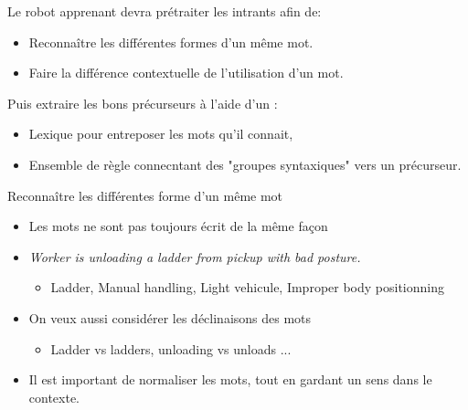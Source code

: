 \begin{frame}	
	Le robot apprenant devra prétraiter les intrants afin de:
	\begin{itemize}
		\item Reconnaître les différentes formes d'un même mot.		
		\item Faire la différence contextuelle de l'utilisation d'un mot.		
	\end{itemize}
	Puis extraire les bons précurseurs à l'aide d'un :
	\begin{itemize}
		\item Lexique pour entreposer les mots qu'il connait, 		
		\item Ensemble de règle connecntant des "groupes syntaxiques" vers un précurseur.		
	\end{itemize}
\end{frame}


\begin{frame}
	Reconnaître les différentes forme d'un même mot
	\begin{itemize}
		\item Les mots ne sont pas toujours écrit de la même façon
		\item \textit{Worker is unloading a ladder from pickup with bad posture.}\\
		\begin{itemize}
			\item Ladder, Manual handling, Light vehicule, Improper body positionning
		\end{itemize}
		\item On veux aussi considérer les déclinaisons des mots
		\begin{itemize}
			\item Ladder vs ladders, unloading vs unloads ...
		\end{itemize}
		\item Il est important de normaliser les mots, tout en gardant un sens dans le contexte.
	\end{itemize}
\end{frame}



